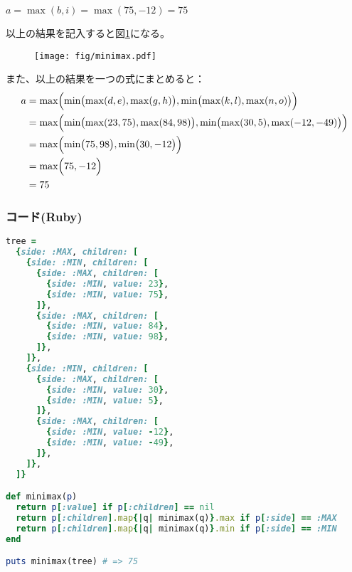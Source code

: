 \documentclass[11pt,a4paper]{ltjsarticle}
\begin{document}
$a = \max(b, i) = \max(75, -12) = 75$

以上の結果を記入すると図\ref{fig/minimax}になる。

\begin{figure}[h]
  \centering
  \texttt{[image: fig/minimax.pdf]}
  \caption{}
  \label{fig/minimax}
\end{figure}

また、以上の結果を一つの式にまとめると：
\begin{equation}
  \label{eq1}
  \begin{split}
    a &= \max\Bigl(
      \min\bigl(  
        \max(d, e), \max(g, h)
      \bigr),
      \min\bigl(   
        \max(k, l), \max(n, o) 
      \bigr)
    \Bigr) \\
    &= \max\Bigl(
      \min\bigl(  
        \max(23, 75), \max(84, 98)
      \bigr),
      \min\bigl(   
        \max(30, 5), \max(-12, -49) 
      \bigr)
    \Bigr) \\
    &= \max\Bigl(
      \min\bigl(75, 98\bigr),
      \min\bigl(30, -12\bigr)
    \Bigr) \\
    &= \max\Bigl(75, -12\Bigr) \\
    &= 75
  \end{split}
\end{equation}


\subsubsection{コード(Ruby)}

\begin{lstlisting}[language=ruby,caption=minimax.rb,label=list/minimax]
tree =
  {side: :MAX, children: [
    {side: :MIN, children: [
      {side: :MAX, children: [
        {side: :MIN, value: 23},
        {side: :MIN, value: 75},
      ]},
      {side: :MAX, children: [
        {side: :MIN, value: 84},
        {side: :MIN, value: 98},
      ]},
    ]},
    {side: :MIN, children: [
      {side: :MAX, children: [
        {side: :MIN, value: 30},
        {side: :MIN, value: 5},
      ]},
      {side: :MAX, children: [
        {side: :MIN, value: -12},
        {side: :MIN, value: -49},
      ]},
    ]},
  ]}

def minimax(p)
  return p[:value] if p[:children] == nil
  return p[:children].map{|q| minimax(q)}.max if p[:side] == :MAX
  return p[:children].map{|q| minimax(q)}.min if p[:side] == :MIN
end

puts minimax(tree) # => 75
\end{lstlisting}
\end{document}
